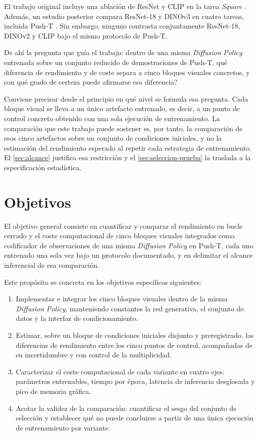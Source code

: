 El trabajo original incluye una ablaci\'on de ResNet y CLIP en la tarea \textit{Square}
\cite{chi2025diffusion}. Adem\'as, un estudio posterior compara ResNet-18 y DINOv3 en
cuatro tareas, incluida Push-T \cite{egbe2025dinov3dp}. Sin embargo, ninguno contrasta
conjuntamente ResNet-18, DINOv2 y CLIP bajo el mismo protocolo de Push-T.

De ah\'i la pregunta que gu\'ia el trabajo: dentro de una misma \textit{Diffusion Policy}
entrenada sobre un conjunto reducido de demostraciones de Push-T, \textquestiondown qu\'e diferencia
de rendimiento y de coste separa a cinco bloques visuales concretos, y con qu\'e grado de
certeza puede afirmarse esa diferencia?

Conviene precisar desde el principio en qu\'e nivel se formula esa pregunta. Cada bloque
visual se lleva a un \'unico artefacto entrenado, es decir, a un punto de control
concreto obtenido con una sola ejecuci\'on de entrenamiento. La comparaci\'on que este
trabajo puede sostener es, por tanto, la comparaci\'on de esos cinco artefactos sobre un
conjunto de condiciones iniciales, y no la estimaci\'on del rendimiento esperado al
repetir cada estrategia de entrenamiento. El \cref{sec:alcance} justifica esa restricci\'on
y el \cref{sec:seleccion-prueba} la traslada a la especificaci\'on estad\'istica.

\section{Objetivos}
\label{sec:objetivos}

El objetivo general consiste en cuantificar y comparar el rendimiento en bucle cerrado y
el coste computacional de cinco bloques visuales integrados como codificador de
observaciones de una misma \textit{Diffusion Policy} en Push-T, cada uno entrenado una
sola vez bajo un protocolo documentado, y en delimitar el alcance inferencial de esa
comparaci\'on.

Este prop\'osito se concreta en los objetivos espec\'ificos siguientes:

\begin{enumerate}[label=\arabic*.,leftmargin=*]
  \item Implementar e integrar los cinco bloques visuales dentro de la misma
        \textit{Diffusion Policy}, manteniendo constantes la red generativa, el conjunto
        de datos y la interfaz de condicionamiento.
  \item Estimar, sobre un bloque de condiciones iniciales disjunto y preregistrado, las
        diferencias de rendimiento entre los cinco puntos de control, acompa\~nadas de su
        incertidumbre y con control de la multiplicidad.
  \item Caracterizar el coste computacional de cada variante en cuatro ejes:
        par\'ametros entrenables, tiempo por \'epoca, latencia de inferencia desglosada y
        pico de memoria gr\'afica.
  \item Acotar la validez de la comparaci\'on: cuantificar el sesgo del conjunto de
        selecci\'on y establecer qu\'e no puede concluirse a partir de una \'unica
        ejecuci\'on de entrenamiento por variante.
\end{enumerate}

